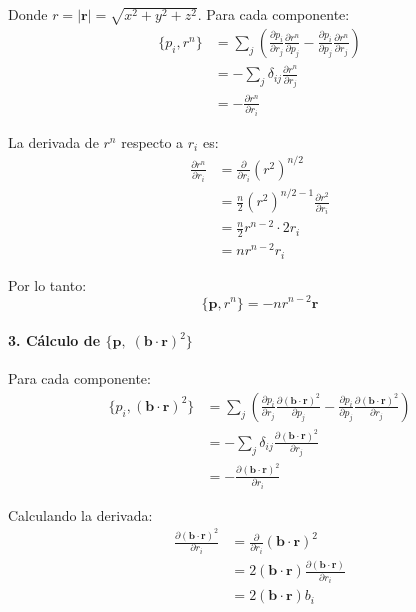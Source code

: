 \documentclass[12pt]{article}
\begin{document}
\begin{enumerate}
  Donde $r = |\mathbf{r}| = \sqrt{x^2 + y^2 + z^2}$. Para cada componente:
  \begin{align}
  \{p_i, r^n\} &= \sum_j\left(\frac{\partial p_i}{\partial r_j}\frac{\partial r^n}{\partial p_j} - \frac{\partial p_i}{\partial p_j}\frac{\partial r^n}{\partial r_j}\right) \\
  &= -\sum_j \delta_{ij}\frac{\partial r^n}{\partial r_j} \\
  &= -\frac{\partial r^n}{\partial r_i}
  \end{align}

  La derivada de $r^n$ respecto a $r_i$ es:
  \begin{align}
  \frac{\partial r^n}{\partial r_i} &= \frac{\partial}{\partial r_i}(r^2)^{n/2} \\
  &= \frac{n}{2}(r^2)^{n/2-1}\frac{\partial r^2}{\partial r_i} \\
  &= \frac{n}{2}r^{n-2}\cdot 2r_i \\
  &= nr^{n-2}r_i
  \end{align}

  Por lo tanto:
  \[
  \{\mathbf{p}, r^n\} = -n r^{n-2} \mathbf{r}
  \]

  \paragraph{3. Cálculo de $\{\mathbf p,\;(\mathbf b\cdot\mathbf r)^2\}$}

  Para cada componente:
  \begin{align}
  \{p_i, (\mathbf{b}\cdot\mathbf{r})^2\} &= \sum_j\left(\frac{\partial p_i}{\partial r_j}\frac{\partial(\mathbf{b}\cdot\mathbf{r})^2}{\partial p_j} - \frac{\partial p_i}{\partial p_j}\frac{\partial(\mathbf{b}\cdot\mathbf{r})^2}{\partial r_j}\right) \\
  &= -\sum_j \delta_{ij}\frac{\partial(\mathbf{b}\cdot\mathbf{r})^2}{\partial r_j} \\
  &= -\frac{\partial(\mathbf{b}\cdot\mathbf{r})^2}{\partial r_i}
  \end{align}

  Calculando la derivada:
  \begin{align}
  \frac{\partial(\mathbf{b}\cdot\mathbf{r})^2}{\partial r_i} &= \frac{\partial}{\partial r_i}(\mathbf{b}\cdot\mathbf{r})^2 \\
  &= 2(\mathbf{b}\cdot\mathbf{r})\frac{\partial(\mathbf{b}\cdot\mathbf{r})}{\partial r_i} \\
  &= 2(\mathbf{b}\cdot\mathbf{r})b_i
  \end{align}


\end{enumerate}
\end{document}
